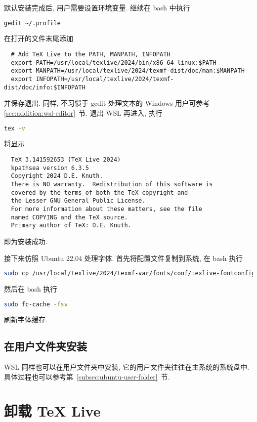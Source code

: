 默认安装完成后, 用户需要设置环境变量.
继续在 \textsf{bash} 中执行
\begin{lstlisting}[language = bash]
  gedit ~/.profile
\end{lstlisting}
在打开的文件末尾添加
\begin{lstlisting}
  # Add TeX Live to the PATH, MANPATH, INFOPATH
  export PATH=/usr/local/texlive/2024/bin/x86_64-linux:$PATH
  export MANPATH=/usr/local/texlive/2024/texmf-dist/doc/man:$MANPATH
  export INFOPATH=/usr/local/texlive/2024/texmf-dist/doc/info:$INFOPATH
\end{lstlisting}
并保存退出.
同样,
不习惯于 \textsf{gedit} 处理文本的 Windows 用户可参考 \ref{sec:addition:wsl-editor}~节.
退出 WSL 再进入,
执行
\begin{lstlisting}[language=bash]
  tex -v
\end{lstlisting}
将显示
\begin{lstlisting}
  TeX 3.141592653 (TeX Live 2024)
  kpathsea version 6.3.5
  Copyright 2024 D.E. Knuth.
  There is NO warranty.  Redistribution of this software is
  covered by the terms of both the TeX copyright and
  the Lesser GNU General Public License.
  For more information about these matters, see the file
  named COPYING and the TeX source.
  Primary author of TeX: D.E. Knuth.
\end{lstlisting}
即为安装成功.

接下来仿照 Ubuntu 22.04 处理字体.
首先将配置文件复制到系统,
在 \textsf{bash} 执行
\begin{lstlisting}[language=bash]
  sudo cp /usr/local/texlive/2024/texmf-var/fonts/conf/texlive-fontconfig.conf /etc/fonts/conf.d/09-texlive.conf
\end{lstlisting}
然后在 \textsf{bash} 执行
\begin{lstlisting}[language=bash]
  sudo fc-cache -fsv
\end{lstlisting}
刷新字体缓存.

\subsection{在用户文件夹安装}

WSL 同样也可以在用户文件夹中安装,
它的用户文件夹往往在主系统的系统盘中.
具体过程也可以参考第~\ref{subsec:ubuntu-user-folder}~节.

\section{卸载 \TeX{} Live}

